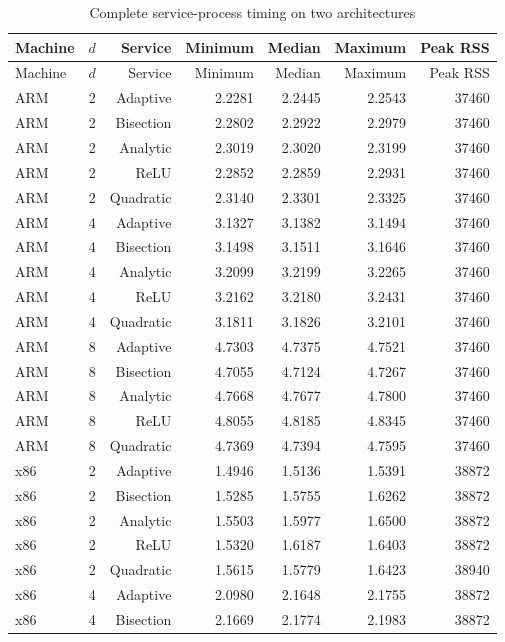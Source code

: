 {\small\setlength{\tabcolsep}{3pt}
\begin{longtable}{lrrrrrr}
\caption{Complete service-process timing on two architectures}\label{tab:timing89}\\
\hline
Machine & $d$ & Service & Minimum & Median & Maximum & Peak RSS \\
\hline
\endfirsthead
\hline
Machine & $d$ & Service & Minimum & Median & Maximum & Peak RSS \\
\hline
\endhead
ARM & 2 & Adaptive & 2.2281 & 2.2445 & 2.2543 & 37460 \\
ARM & 2 & Bisection & 2.2802 & 2.2922 & 2.2979 & 37460 \\
ARM & 2 & Analytic & 2.3019 & 2.3020 & 2.3199 & 37460 \\
ARM & 2 & ReLU & 2.2852 & 2.2859 & 2.2931 & 37460 \\
ARM & 2 & Quadratic & 2.3140 & 2.3301 & 2.3325 & 37460 \\
ARM & 4 & Adaptive & 3.1327 & 3.1382 & 3.1494 & 37460 \\
ARM & 4 & Bisection & 3.1498 & 3.1511 & 3.1646 & 37460 \\
ARM & 4 & Analytic & 3.2099 & 3.2199 & 3.2265 & 37460 \\
ARM & 4 & ReLU & 3.2162 & 3.2180 & 3.2431 & 37460 \\
ARM & 4 & Quadratic & 3.1811 & 3.1826 & 3.2101 & 37460 \\
ARM & 8 & Adaptive & 4.7303 & 4.7375 & 4.7521 & 37460 \\
ARM & 8 & Bisection & 4.7055 & 4.7124 & 4.7267 & 37460 \\
ARM & 8 & Analytic & 4.7668 & 4.7677 & 4.7800 & 37460 \\
ARM & 8 & ReLU & 4.8055 & 4.8185 & 4.8345 & 37460 \\
ARM & 8 & Quadratic & 4.7369 & 4.7394 & 4.7595 & 37460 \\
x86 & 2 & Adaptive & 1.4946 & 1.5136 & 1.5391 & 38872 \\
x86 & 2 & Bisection & 1.5285 & 1.5755 & 1.6262 & 38872 \\
x86 & 2 & Analytic & 1.5503 & 1.5977 & 1.6500 & 38872 \\
x86 & 2 & ReLU & 1.5320 & 1.6187 & 1.6403 & 38872 \\
x86 & 2 & Quadratic & 1.5615 & 1.5779 & 1.6423 & 38940 \\
x86 & 4 & Adaptive & 2.0980 & 2.1648 & 2.1755 & 38872 \\
x86 & 4 & Bisection & 2.1669 & 2.1774 & 2.1983 & 38872 \\

\end{longtable}}
